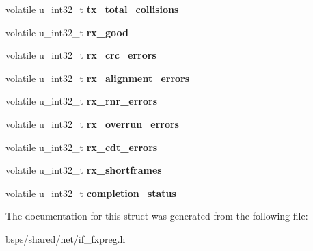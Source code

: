 \begin{DoxyCompactItemize}
volatile u\+\_\+int32\+\_\+t {\bfseries tx\+\_\+total\+\_\+collisions}
\item 
\mbox{\label{structfxp__stats_a33c513af4449181a7a274e9a79f67d57}} 
volatile u\+\_\+int32\+\_\+t {\bfseries rx\+\_\+good}
\item 
\mbox{\label{structfxp__stats_a19d2afb1d5696cd389e86fb2d09aa5f3}} 
volatile u\+\_\+int32\+\_\+t {\bfseries rx\+\_\+crc\+\_\+errors}
\item 
\mbox{\label{structfxp__stats_a49ea7e63951685cd3a42772eb1d9eeb1}} 
volatile u\+\_\+int32\+\_\+t {\bfseries rx\+\_\+alignment\+\_\+errors}
\item 
\mbox{\label{structfxp__stats_a562c2656f42182b4241a1005a00c3d89}} 
volatile u\+\_\+int32\+\_\+t {\bfseries rx\+\_\+rnr\+\_\+errors}
\item 
\mbox{\label{structfxp__stats_a1142750473bdd35516da7e9a2a23b8b4}} 
volatile u\+\_\+int32\+\_\+t {\bfseries rx\+\_\+overrun\+\_\+errors}
\item 
\mbox{\label{structfxp__stats_aedbc13fd0629abba7c2abf91d4be6ae1}} 
volatile u\+\_\+int32\+\_\+t {\bfseries rx\+\_\+cdt\+\_\+errors}
\item 
\mbox{\label{structfxp__stats_af2b3cf40766c998af5b9363032562762}} 
volatile u\+\_\+int32\+\_\+t {\bfseries rx\+\_\+shortframes}
\item 
\mbox{\label{structfxp__stats_aa9a0a5b885f01566f7648a3081f60062}} 
volatile u\+\_\+int32\+\_\+t {\bfseries completion\+\_\+status}
\end{DoxyCompactItemize}


The documentation for this struct was generated from the following file\+:\begin{DoxyCompactItemize}
\item 
bsps/shared/net/if\+\_\+fxpreg.\+h\end{DoxyCompactItemize}

